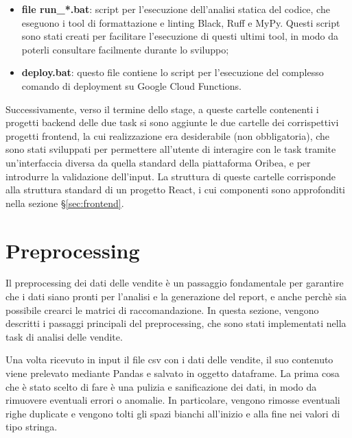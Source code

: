 \begin{itemize}
    \item \textbf{file run\_*.bat}: script per l'esecuzione dell'analisi statica del codice, che eseguono i tool di formattazione e linting Black, Ruff e MyPy. Questi script sono stati creati per facilitare l'esecuzione di questi ultimi tool, in modo da poterli consultare facilmente durante lo sviluppo;
    \item \textbf{deploy.bat}: questo file contiene lo script per l'esecuzione del complesso comando di deployment su Google Cloud Functions.
\end{itemize}

Successivamente, verso il termine dello stage, a queste cartelle contenenti i progetti backend delle due task si sono aggiunte le due cartelle dei corrispettivi progetti frontend, la cui realizzazione era desiderabile (non obbligatoria), che sono stati sviluppati per permettere all'utente di interagire con le task tramite un'interfaccia diversa da quella standard della piattaforma Oribea, e per introdurre la validazione dell'input. La struttura di queste cartelle corrisponde alla struttura standard di un progetto React, i cui componenti sono approfonditi nella sezione \S\ref{sec:frontend}.



\section{Preprocessing}
\label{sec:preprocessing}

Il preprocessing dei dati delle vendite è un passaggio fondamentale per garantire che i dati siano pronti per l'analisi e la generazione del report, e anche perchè sia possibile crearci le matrici di raccomandazione.
In questa sezione, vengono descritti i passaggi principali del preprocessing, che sono stati implementati nella task di analisi delle vendite.

Una volta ricevuto in input il file csv con i dati delle vendite, il suo contenuto viene prelevato mediante Pandas e salvato in oggetto \gls{dataframe}. La prima cosa che è stato scelto di fare è una pulizia e sanificazione dei dati, in modo da rimuovere eventuali errori o anomalie. In particolare, vengono rimosse eventuali righe duplicate e vengono tolti gli spazi bianchi all'inizio e alla fine nei valori di tipo stringa.

